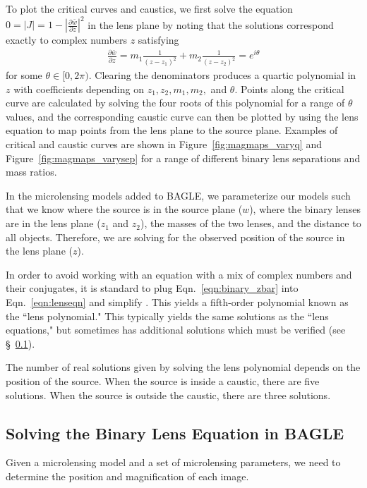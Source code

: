 \documentclass[twocolumn]{aastex701}
\begin{document}
To plot the critical curves and caustics, we first solve the equation $0 = |J| = 1 - \left| \frac{\partial \bar{w}}{\partial z} \right|^2$ in the lens plane by noting that the solutions correspond exactly to complex numbers $z$ satisfying 
\begin{align}
\frac{\partial \bar{w}}{\partial z} = m_1 \frac{1}{(z - z_1)^2} + m_2 \frac{1}{(z - z_2)^2} = e^{i\theta}
\end{align}
for some $\theta \in [0,2\pi)$. Clearing the denominators produces a quartic polynomial in $z$ with coefficients depending on $z_1,z_2,m_1,m_2,$ and $\theta$. Points along the critical curve are calculated by solving the four roots of this polynomial for a range of $\theta$ values, and the corresponding caustic curve can then be plotted by using the lens equation to map points from the lens plane to the source plane. Examples of critical and caustic curves are shown in Figure~\ref{fig:magmaps_varyq} and Figure~\ref{fig:magmaps_varysep} for a range of different binary lens separations and mass ratios.

In the microlensing models added to BAGLE, we parameterize our models such that we know where the source is in the source plane ($w$), where the binary lenses are in the lens plane ($z_1$ and $z_2$), the masses of the two lenses, and the distance to all objects. Therefore, we are solving for the observed position of the source in the lens plane ($z$).

In order to avoid working with an equation with a mix of complex numbers and their conjugates, it is standard to plug Eqn.~\ref{eqn:binary_zbar} into Eqn.~\ref{eqn:lenseqn} and simplify \citep[see][]{Witt1990, WittShude1995}. This yields a fifth-order polynomial known as the ``lens polynomial." This typically yields the same solutions as the ``lens equations," but sometimes has additional solutions which must be verified (see \S~\ref {sec:binlenses_eqn2}).

The number of real solutions given by solving the lens polynomial depends on the position of the source. When the source is inside a caustic, there are five solutions. When the source is outside the caustic, there are three solutions. 


\subsection{Solving the Binary Lens Equation in BAGLE}
\label{sec:binlenses_eqn2}

Given a microlensing model and a set of microlensing parameters, we need to determine the position and magnification of each image.
\end{document}
